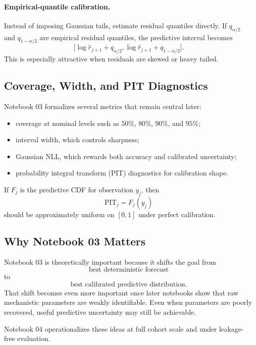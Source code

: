 \documentclass[11pt,a4paper]{article}
\newcommand{\PIT}{\mathrm{PIT}}
\begin{document}
\paragraph{Empirical-quantile calibration.}
Instead of imposing Gaussian tails, estimate residual quantiles directly. If $q_{\alpha/2}$ and $q_{1-\alpha/2}$ are empirical residual quantiles, the predictive interval becomes
\[
    \bigl[
        \log \widehat r_{j+1}+q_{\alpha/2},
        \log \widehat r_{j+1}+q_{1-\alpha/2}
    \bigr].
\]
This is especially attractive when residuals are skewed or heavy tailed.

\subsection{Coverage, Width, and PIT Diagnostics}

Notebook 03 formalizes several metrics that remain central later:
\begin{itemize}[leftmargin=2em]
    \item coverage at nominal levels such as $50\%$, $80\%$, $90\%$, and $95\%$;
    \item interval width, which controls sharpness;
    \item Gaussian NLL, which rewards both accuracy and calibrated uncertainty;
    \item probability integral transform (PIT) diagnostics for calibration shape.
\end{itemize}

If $F_j$ is the predictive CDF for observation $y_j$, then
\[
    \PIT_j = F_j(y_j)
\]
should be approximately uniform on $[0,1]$ under perfect calibration.

\subsection{Why Notebook 03 Matters}

Notebook 03 is theoretically important because it shifts the goal from
\[
    \text{best deterministic forecast}
\]
to
\[
    \text{best calibrated predictive distribution}.
\]
That shift becomes even more important once later notebooks show that raw mechanistic parameters are weakly identifiable. Even when parameters are poorly recovered, useful predictive uncertainty may still be achievable.

Notebook 04 operationalizes these ideas at full cohort scale and under leakage-free evaluation.

\end{document}
